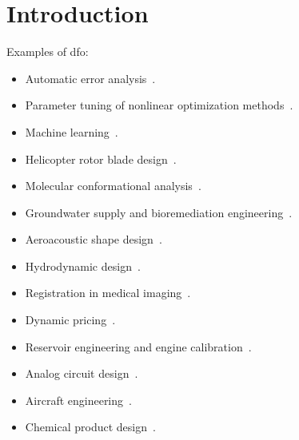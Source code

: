 %
%
%
\chapter{Introduction}

%
%
%

Examples of \gls{dfo}:
\begin{itemize}
    \item Automatic error analysis~\cite{Higham_1993,Higham_2002}.
    \item Parameter tuning of nonlinear optimization methods~\cite{Audet_Orban_2006}.
    \item Machine learning~\cite{Ghanbari_Scheinberg_2017,Qian_Yu_2021}.
    \item Helicopter rotor blade design~\cite{Booker_Etal_1998a,Booker_Etal_1998b,Serafini_1998}.
    \item Molecular conformational analysis~\cite{Alberto_Etal_2004,Meza_Martinez_1994}.
    \item Groundwater supply and bioremediation engineering~\cite{Fowler_Etal_2008,Mugunthan_Shoemaker_Regis_2005,Yoon_Shoemaker_1999}.
    \item Aeroacoustic shape design~\cite{Marsden_2004,Marsden_Etal_2004}.
    \item Hydrodynamic design~\cite{Duvigneau_Visonneau_2004}.
    \item Registration in medical imaging~\cite{Oeuvray_2005,Oeuvray_Bierlaire_2007}.
    \item Dynamic pricing~\cite{Levina_Etal_2009}.
    \item Reservoir engineering and engine calibration~\cite{Langouet_2011}.
    \item Analog circuit design~\cite{Latorre_Etal_2019}.
    \item Aircraft engineering~\cite{Gazaix_Etal_2019}.
    \item Chemical product design~\cite{Sun_Etal_2020}.
\end{itemize}
